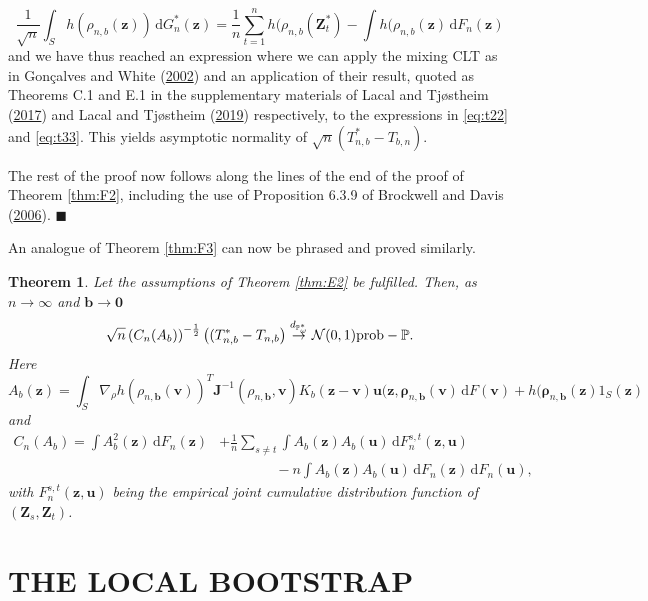 \documentclass[
  12pt,
  letterpaper]{article}
\newtheorem{thm}{Theorem}[section]
\numberwithin{equation}{section}
\newcommand{\Z}{\bm{Z}}
\newcommand{\z}{\bm{z}}
\newcommand{\fv}{\bm{v}}
\newcommand{\fu}{\bm{u}}
\newcommand{\J}{\bm{J}}
\newcommand{\frho}{\bm{\rho}}
\newcommand{\bb}{\bm{b}}
\newcommand{\di}{\,\textrm{d}}
\begin{document}
\begin{equation}
\frac{1}{\sqrt{n}} \int_S h(\rho_{n,b}(\z)) \di G_n^*(\z) = \frac{1}{n}\sum_{t=1}^{n}h(\rho_{n,b}(\Z_t^{*}) - \int h(\rho_{n,b}(\z) \di F_n(\z)
\label{eq:t33}
\end{equation}
and we have thus reached an expression where we can apply the mixing CLT as in Gonçalves and White (\protect\hyperlink{ref-gonccalves2002bootstrap}{2002}) and an application of their result, quoted as Theorems C.1 and E.1 in the supplementary materials of Lacal and Tjøstheim (\protect\hyperlink{ref-lacal2017local}{2017}) and Lacal and Tjøstheim (\protect\hyperlink{ref-lacal2018estimating}{2019}) respectively, to the expressions in \eqref{eq:t22} and \eqref{eq:t33}. This yields asymptotic normality of \(\sqrt{n}(T_{n,b}^*-T_{b,n})\).

The rest of the proof now follows along the lines of the end of the proof of Theorem \ref{thm:F2}, including the use of Proposition 6.3.9 of Brockwell and Davis (\protect\hyperlink{ref-brockwell1991time}{2006}). \(\blacksquare\)

An analogue of Theorem \ref{thm:F3} can now be phrased and proved similarly.

\begin{thm}
Let the assumptions of Theorem \ref{thm:E2} be fulfilled. Then,
as $n \to \infty$ and $\bb \to \bm{0}$
$$
\sqrt{n}\left(C_{n}(A_b)\right)^{-\frac{1}{2}}\left((T_{n,b}^* - T_{n,b}\right) \buildrel {d_{\mathbb{P}_{\omega}^*}} \over {\to} {\cal N}(0,1)\mbox{prob}-\mathbb{P}.
$$
Here 
$$
A_b(\z) = \int_S \nabla_{\rho}h(\rho_{n,\bb}(\fv))^{T}{\J}^{-1}(\rho_{n,\bb},\fv)K_b(\z-\fv)\fu(\z,\frho_{n,\bb}(\fv) \di F(\fv) + h(\frho_{n,\bb}(\z)1_S(\z)
$$
and 
\begin{align*}
C_n(A_b) = \int A_b^2(\z) \di F_n(\z) &+ \frac{1}{n}\sum_{s \neq t}\int A_b(\z)A_b(\fu) \di F_n^{s,t}(\z,\fu) \\ & \qquad\qquad- n\int A_b(\z)A_b(\fu)\di F_n(\z) \di F_n(\fu),
\end{align*}
with $F_n^{s,t}(\z,\fu)$ being the empirical joint cumulative distribution function of $(\Z_s,\Z_t)$.
\label{thm:H2}
\end{thm}

\hypertarget{the-local-bootstrap}{%
\section{THE LOCAL BOOTSTRAP}\label{the-local-bootstrap}}
\end{document}
